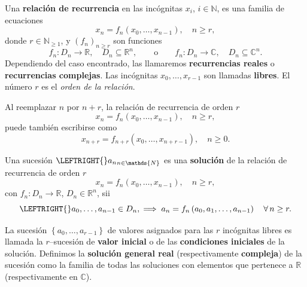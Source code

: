 \begin{definition}\label{def:recurrence}
	Una \textbf{relación de recurrencia} en las incógnitas $x_{i}$, $i\in\mathds{N}$, es una familia de ecuaciones
	\begin{equation*}
	x_{n}=f_{n}\left(x_{0},\ldots,x_{n-1}\right),\quad n\geq r,
	\end{equation*}
	donde $r\in\mathds{N}_{\geq1}$, y ${\left(f_{n}\right)}_{n\geq r}$ son funciones
	\begin{equation*}
	f_{n}\colon D_{n}\rightarrow\mathds{R},\quad D_{n}\subseteq\mathds{R}^{n},\qquad\text{o}\qquad f_{n}\colon D_{n}\rightarrow\mathds{C},\quad D_{n}\subseteq\mathds{C}^{n}.
	\end{equation*}
	Dependiendo del caso encontrado, las llamaremos \textbf{recurrencias reales} o \textbf{recurrencias complejas}. Las incógnitas $x_{0},\ldots,x_{r-1}$ son llamadas \textbf{libres}. El número $r$ es el \emph{orden de la relación}.
	
	Al reemplazar $n$ por $n+r$, la relación de recurrencia de orden $r$
	\begin{equation*}
	x_{n}=f_{n}\left(x_{0},\ldots,x_{n-1}\right),\quad n\geq r,
	\end{equation*}
	puede también escribirse como
	\begin{equation*}
	x_{n+r}=f_{n+r}\left(x_{0},\ldots,x_{n+r-1}\right),\quad n\geq0.
	\end{equation*}
\end{definition}

\begin{definition}
	Una sucesión $ \LEFTRIGHT\{\}{a_{n}}_{n\in\mathds{N}}$ es una \textbf{solución} de la relación de recurrencia de orden $r$
	\begin{equation}
	x_{n}=f_{n}\left(x_{0},\ldots,x_{n-1}\right),\quad n\geq r,
	\end{equation}
	con $f_{n}\colon D_{n}\rightarrow\mathds{R}$, $D_{n}\in\mathds{R}^{n}$, sii
	\begin{equation*}
	\LEFTRIGHT\{\}{a_{0},\ldots,a_{n-1}}\in D_{n},\implies a_{n}=f_{n}\left(a_{0},a_{1},\ldots,a_{n-1}\right)\quad\forall\,n\geq r.
	\end{equation*}
\end{definition}

La sucesión $\left\{a_{0},\ldots,a_{r-1}\right\}$ de valores asignados para las $r$ incógnitas libres es llamada la $r$--sucesión de \textbf{valor inicial} o de las \textbf{condiciones iniciales} de la solución. Definimos la \textbf{solución general real} (respectivamente \textbf{compleja}) de la sucesión como la familia de todas las soluciones con elementos que pertenece a $\mathds{R}$ (respectivamente en $\mathds{C}$).


